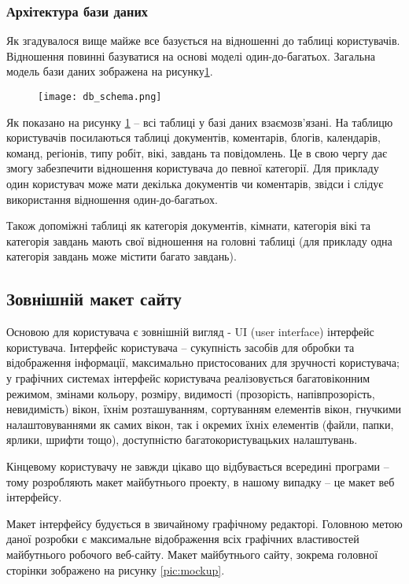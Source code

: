 \subsubsection{Архітектура бази даних}
Як згадувалося вище майже все базується на відношенні до таблиці користувачів. Відношення повинні базуватися на основі моделі один-до-багатьох. Загальна модель бази даних зображена на рисунку\ref{pic:db_shema}.
\begin{figure}[!ht]
\centering
		\texttt{[image: db\_schema.png]}
		\label{pic:db_shema}
\end{figure}
\par Як показано на рисунку \ref{pic:db_shema} -- всі таблиці у базі даних взаємозв'язані. На таблицю користувачів посилаються таблиці документів, коментарів, блогів, календарів, команд, регіонів, типу робіт, вікі, завдань та повідомлень. 
Це в свою чергу дає змогу забезпечити відношення користувача до певної категорії. 
Для прикладу один користувач може мати декілька документів чи коментарів, звідси і слідує використання відношення один-до-багатьох. 
\par Також допоміжні таблиці як категорія документів, кімнати, категорія вікі та категорія завдань мають свої відношення на головні таблиці (для прикладу одна категорія завдань може містити багато завдань).


\subsection{Зовнішній макет сайту}
Основою для користувача є зовнішній вигляд - UI (user interface) інтерфейс користувача. 
Інтерфейс користувача -- сукупність засобів для обробки та відображення інформації, максимально пристосованих для зручності користувача; у графічних системах інтерфейс користувача реалізовується багатовіконним режимом, змінами кольору, розміру, видимості (прозорість, напівпрозорість, невидимість) вікон, їхнім розташуванням, сортуванням елементів вікон, гнучкими налаштовуваннями як самих вікон, так і окремих їхніх елементів (файли, папки, ярлики, шрифти тощо), доступністю багатокористувацьких налаштувань.
\par Кінцевому користувачу не завжди цікаво що відбувається всередині програми -- тому розробляють макет майбутнього проекту, в нашому випадку -- це макет веб інтерфейсу. 
\par Макет інтерфейсу будується в звичайному графічному редакторі. Головною метою даної розробки є максимальне відображення всіх графічних властивостей майбутнього робочого веб-сайту. Макет майбутнього сайту, зокрема головної сторінки зображено на рисунку \ref{pic:mockup}.

